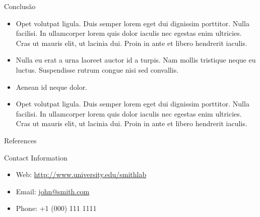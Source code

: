 \documentclass[final,hyperref={pdfpagelabels=false}]{beamer}
\begin{document}
\begin{frame}[t]
\begin{columns}[t]
\begin{column}{.465\textwidth}
\begin{block}{Conclus\~ao}

\begin{itemize}
\item Opet volutpat ligula. Duis semper lorem eget dui dignissim porttitor. Nulla facilisi. In ullamcorper lorem quis dolor iaculis nec egestas enim ultricies. Cras ut mauris elit, ut lacinia dui. Proin in ante et libero hendrerit iaculis.
\item Nulla eu erat a urna laoreet auctor id a turpis. Nam mollis tristique neque eu luctus. Suspendisse rutrum congue nisi sed convallis. 
\item Aenean id neque dolor.
\item Opet volutpat ligula. Duis semper lorem eget dui dignissim porttitor. Nulla facilisi. In ullamcorper lorem quis dolor iaculis nec egestas enim ultricies. Cras ut mauris elit, ut lacinia dui. Proin in ante et libero hendrerit iaculis.
\end{itemize}

\end{block}


\begin{block}{References}
        
\nocite{*} %
\small{
}

\end{block}





\begin{block}{Contact Information}

\begin{itemize}
\item Web: \href{http://www.university.edu/smithlab}{http://www.university.edu/smithlab}
\item Email: \href{mailto:john@smith.com}{john@smith.com}
\item Phone: +1 (000) 111 1111
\end{itemize}


\end{block}
\end{column}
\end{columns}
\end{frame}
\end{document}
